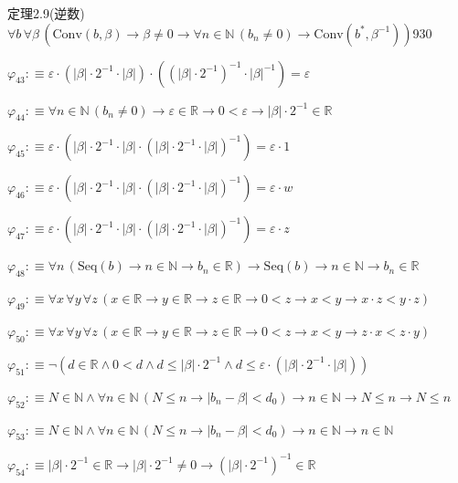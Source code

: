 \begin{fullproof}{定理2.9(逆数)}{$\forall b\,\forall \beta\,(\mathrm{Conv}(b,\beta) \to \beta \neq 0 \to \forall n \in \mathbb{N}\,(b_{n} \neq 0) \to \mathrm{Conv}(b^{\ast},\beta^{-1}))$}{930}
\begin{abbrevlist}
\item $\varphi_{43} :\equiv \varepsilon \cdot (\lvert \beta \rvert \cdot 2^{-1} \cdot \lvert \beta \rvert) \cdot ((\lvert \beta \rvert \cdot 2^{-1})^{-1} \cdot \lvert \beta \rvert^{-1}) = \varepsilon$
\item $\varphi_{44} :\equiv \forall n \in \mathbb{N}\,(b_{n} \neq 0) \to \varepsilon \in \mathbb{R} \to 0 < \varepsilon \to \lvert \beta \rvert \cdot 2^{-1} \in \mathbb{R}$
\item $\varphi_{45} :\equiv \varepsilon \cdot (\lvert \beta \rvert \cdot 2^{-1} \cdot \lvert \beta \rvert \cdot (\lvert \beta \rvert \cdot 2^{-1} \cdot \lvert \beta \rvert)^{-1}) = \varepsilon \cdot 1$
\item $\varphi_{46} :\equiv \varepsilon \cdot (\lvert \beta \rvert \cdot 2^{-1} \cdot \lvert \beta \rvert \cdot (\lvert \beta \rvert \cdot 2^{-1} \cdot \lvert \beta \rvert)^{-1}) = \varepsilon \cdot w$
\item $\varphi_{47} :\equiv \varepsilon \cdot (\lvert \beta \rvert \cdot 2^{-1} \cdot \lvert \beta \rvert \cdot (\lvert \beta \rvert \cdot 2^{-1} \cdot \lvert \beta \rvert)^{-1}) = \varepsilon \cdot z$
\item $\varphi_{48} :\equiv \forall n\,(\mathrm{Seq}(b) \to n \in \mathbb{N} \to b_{n} \in \mathbb{R}) \to \mathrm{Seq}(b) \to n \in \mathbb{N} \to b_{n} \in \mathbb{R}$
\item $\varphi_{49} :\equiv \forall x\,\forall y\,\forall z\,(x \in \mathbb{R} \to y \in \mathbb{R} \to z \in \mathbb{R} \to 0 < z \to x < y \to x \cdot z < y \cdot z)$
\item $\varphi_{50} :\equiv \forall x\,\forall y\,\forall z\,(x \in \mathbb{R} \to y \in \mathbb{R} \to z \in \mathbb{R} \to 0 < z \to x < y \to z \cdot x < z \cdot y)$
\item $\varphi_{51} :\equiv \neg (d \in \mathbb{R} \land 0 < d \land d \leq \lvert \beta \rvert \cdot 2^{-1} \land d \leq \varepsilon \cdot (\lvert \beta \rvert \cdot 2^{-1} \cdot \lvert \beta \rvert))$
\item $\varphi_{52} :\equiv N \in \mathbb{N} \land \forall n \in \mathbb{N}\,(N \leq n \to \lvert b_{n} - \beta \rvert < d_{0}) \to n \in \mathbb{N} \to N \leq n \to N \leq n$
\item $\varphi_{53} :\equiv N \in \mathbb{N} \land \forall n \in \mathbb{N}\,(N \leq n \to \lvert b_{n} - \beta \rvert < d_{0}) \to n \in \mathbb{N} \to n \in \mathbb{N}$
\item $\varphi_{54} :\equiv \lvert \beta \rvert \cdot 2^{-1} \in \mathbb{R} \to \lvert \beta \rvert \cdot 2^{-1} \neq 0 \to (\lvert \beta \rvert \cdot 2^{-1})^{-1} \in \mathbb{R}$

\end{abbrevlist}
\end{fullproof}
